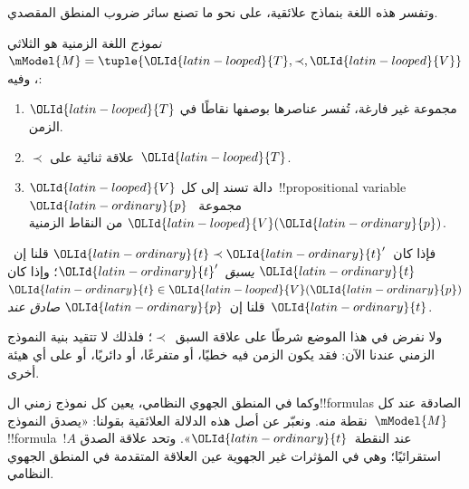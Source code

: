 \documentclass[../../../include/open-logic-section]{subfiles}
\begin{document}
وتفسر هذه اللغة بنماذج علائقية، على نحو ما تصنع سائر ضروب المنطق المقصدي.

\begin{defn}
  \emph{نموذج} اللغة الزمنية هو الثلاثي
  $\mModel{M}=\tuple{\OLId{latin-looped}{T},\prec,\OLId{latin-looped}{V}}$، وفيه:
  \begin{enumerate}
  \item $\OLId{latin-looped}{T}$ مجموعة غير فارغة، تُفسر عناصرها بوصفها نقاطًا في الزمن.
  \item $\prec$ علاقة ثنائية على~$\OLId{latin-looped}{T}$.
  \item $\OLId{latin-looped}{V}$ دالة تسند إلى كل~!!{propositional
    variable}~$\OLId{latin-ordinary}{p}$ مجموعة~$\OLId{latin-looped}{V}(\OLId{latin-ordinary}{p})$ من النقاط الزمنية.
  \end{enumerate}
  فإذا كان~$\OLId{latin-ordinary}{t} \prec \OLId{latin-ordinary}{t}'$ قلنا إن~$\OLId{latin-ordinary}{t}$ \emph{يسبق}~$\OLId{latin-ordinary}{t}'$؛ وإذا كان
  $\OLId{latin-ordinary}{t} \in \OLId{latin-looped}{V}(\OLId{latin-ordinary}{p})$ قلنا إن~$\OLId{latin-ordinary}{p}$ \emph{صادق عند}~$\OLId{latin-ordinary}{t}$.
\end{defn}

ولا نفرض في هذا الموضع شرطًا على علاقة السبق~$\prec$؛ فلذلك لا تتقيد بنية
النموذج الزمني عندنا الآن: فقد يكون الزمن فيه خطيًا، أو متفرعًا، أو دائريًا،
أو على أي هيئة أخرى.

وكما في المنطق الجهوي النظامي، يعين كل نموذج زمني ال!!{formula}s الصادقة
عند كل نقطة منه. ونعبّر عن أصل هذه الدلالة العلائقية بقولنا: «يصدق
النموذج~$\mModel{M}$ !!{formula}~$!A$ عند النقطة~$\OLId{latin-ordinary}{t}$». وتحد علاقة الصدق
استقرائيًا؛ وهي في المؤثرات غير الجهوية عين العلاقة المتقدمة في المنطق
الجهوي النظامي.
\end{document}
